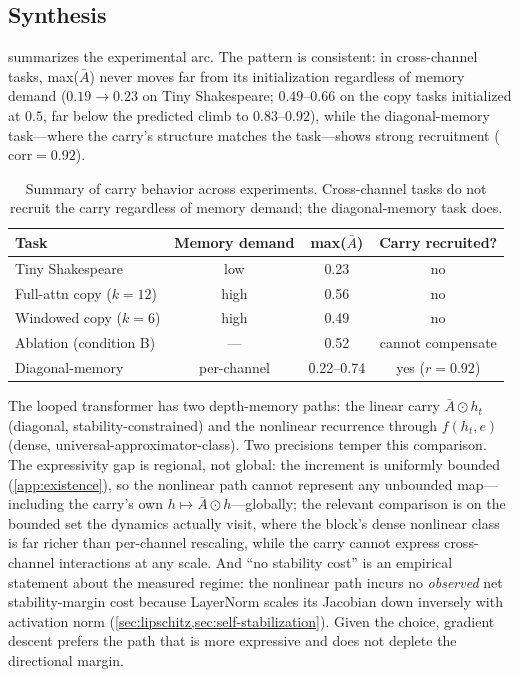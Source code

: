 \documentclass[11pt]{article}
\begin{document}
\subsection{Synthesis}

 summarizes the experimental arc. The pattern is consistent: in cross-channel tasks, max($\bar{A}$) never moves far from its initialization regardless of memory demand ($0.19 \to 0.23$ on Tiny Shakespeare; $0.49$--$0.66$ on the copy tasks initialized at $0.5$, far below the predicted climb to $0.83$--$0.92$), while the diagonal-memory task---where the carry's structure matches the task---shows strong recruitment ($\text{corr} = 0.92$).

\begin{table}[ht]
\centering
\begin{tabular}{@{}lccc@{}}
\toprule
Task & Memory demand & max($\bar{A}$) & Carry recruited? \\
\midrule
Tiny Shakespeare & low & 0.23 & no \\
Full-attn copy ($k{=}12$) & high & 0.56 & no \\
Windowed copy ($k{=}6$) & high & 0.49 & no \\
Ablation (condition B) & --- & 0.52 & cannot compensate \\
Diagonal-memory & per-channel & 0.22--0.74 & yes ($r{=}0.92$) \\
\bottomrule
\end{tabular}
\caption{Summary of carry behavior across experiments. Cross-channel tasks do not recruit the carry regardless of memory demand; the diagonal-memory task does.}
\label{tab:synthesis}
\end{table}

The looped transformer has two depth-memory paths: the linear carry $\bar{A} \odot h_t$ (diagonal, stability-constrained) and the nonlinear recurrence through $f(h_t, e)$ (dense, universal-approximator-class). Two precisions temper this comparison. The expressivity gap is regional, not global: the increment is uniformly bounded (\cref{app:existence}), so the nonlinear path cannot represent any unbounded map---including the carry's own $h \mapsto \bar{A} \odot h$---globally; the relevant comparison is on the bounded set the dynamics actually visit, where the block's dense nonlinear class is far richer than per-channel rescaling, while the carry cannot express cross-channel interactions at any scale. And ``no stability cost'' is an empirical statement about the measured regime: the nonlinear path incurs no \emph{observed} net stability-margin cost because LayerNorm scales its Jacobian down inversely with activation norm (\cref{sec:lipschitz,sec:self-stabilization}). Given the choice, gradient descent prefers the path that is more expressive and does not deplete the directional margin.
\end{document}
